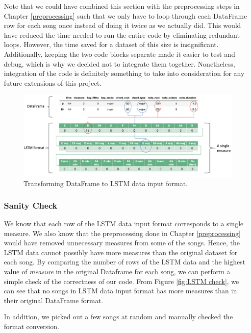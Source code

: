 Note that we could have combined this section with the preprocessing steps in Chapter \ref{preprocessing} such that we only have to loop through each DataFrame row for each song once instead of doing it twice as we actually did. This would have reduced the time needed to run the entire code by eliminating redundant loops. However, the time saved for a dataset of this size is insignificant. Additionally, keeping the two code blocks separate made it easier to test and debug, which is why we decided not to integrate them together. Nonetheless, integration of the code is definitely something to take into consideration for any future extensions of this project.
\begin{figure}
    \centering
    \includegraphics[scale=0.3]{Figures/LSTM pictorial 4}
    \decoRule
    \caption{Transforming DataFrame to LSTM data input format.}
    \label{fig:LSTMData}
\end{figure}
    
\subsubsection{Sanity Check}
\label{lstm check}
We know that each row of the LSTM data input format corresponds to a single measure. We also know that the preprocessing done in Chapter \ref{preprocessing} would have removed unnecessary measures from some of the songs. Hence, the LSTM data cannot possibly have more measures than the original dataset for each song. By comparing the number of rows of the LSTM data and the highest value of \emph{measure} in the original Dataframe for each song, we can perform a simple check of the correctness of our code. From Figure \ref{fig:LSTM check}, we can see that no songs in LSTM data input format has more measures than in their original DataFrame format.

In addition, we picked out a few songs at random and manually checked the format conversion.


